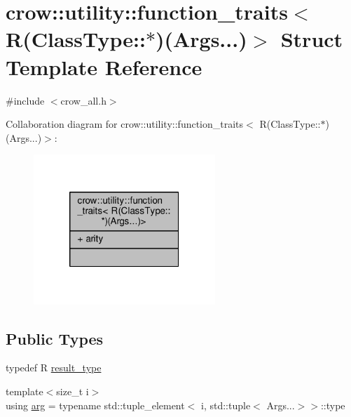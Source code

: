 \hypertarget{structcrow_1_1utility_1_1function__traits_3_01_r_07_class_type_1_1_5_08_07_args_8_8_8_08_4}{\section{crow\-:\-:utility\-:\-:function\-\_\-traits$<$ R(Class\-Type\-:\-:$\ast$)(Args...)$>$ Struct Template Reference}
\label{structcrow_1_1utility_1_1function__traits_3_01_r_07_class_type_1_1_5_08_07_args_8_8_8_08_4}
}


{\ttfamily \#include $<$crow\-\_\-all.\-h$>$}



Collaboration diagram for crow\-:\-:utility\-:\-:function\-\_\-traits$<$ R(Class\-Type\-:\-:$\ast$)(Args...)$>$\-:
\nopagebreak
\begin{figure}[H]
\begin{center}
\leavevmode
\includegraphics[width=194pt]{structcrow_1_1utility_1_1function__traits_3_01_r_07_class_type_1_1_5_08_07_args_8_8_8_08_4__coll__graph}
\end{center}
\end{figure}
\subsection*{Public Types}
\begin{DoxyCompactItemize}
\item 
typedef R \hyperlink{structcrow_1_1utility_1_1function__traits_3_01_r_07_class_type_1_1_5_08_07_args_8_8_8_08_4_a251e619f348901cbe3a218f6b9441dd7}{result\-\_\-type}
\item 
{\footnotesize template$<$size\-\_\-t i$>$ }\\using \hyperlink{structcrow_1_1utility_1_1function__traits_3_01_r_07_class_type_1_1_5_08_07_args_8_8_8_08_4_a0e8df3bac34af430f11227978ee13100}{arg} = typename std\-::tuple\-\_\-element$<$ i, std\-::tuple$<$ Args...$>$$>$\-::type
\end{DoxyCompactItemize}
